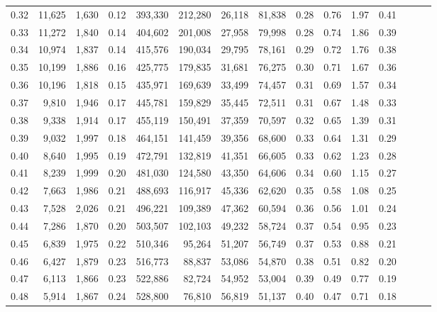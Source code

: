\begin{tabular}{rrrrrrrrrrrrrrr}
0.32 &  11,625 &  1,630 &  0.12 &  393,330 &  212,280 &   26,118 &   81,838 &  0.28 &  0.76 &  1.97 &      0.41 \\
0.33 &  11,272 &  1,840 &  0.14 &  404,602 &  201,008 &   27,958 &   79,998 &  0.28 &  0.74 &  1.86 &      0.39 \\
0.34 &  10,974 &  1,837 &  0.14 &  415,576 &  190,034 &   29,795 &   78,161 &  0.29 &  0.72 &  1.76 &      0.38 \\
0.35 &  10,199 &  1,886 &  0.16 &  425,775 &  179,835 &   31,681 &   76,275 &  0.30 &  0.71 &  1.67 &      0.36 \\
0.36 &  10,196 &  1,818 &  0.15 &  435,971 &  169,639 &   33,499 &   74,457 &  0.31 &  0.69 &  1.57 &      0.34 \\
0.37 &   9,810 &  1,946 &  0.17 &  445,781 &  159,829 &   35,445 &   72,511 &  0.31 &  0.67 &  1.48 &      0.33 \\
0.38 &   9,338 &  1,914 &  0.17 &  455,119 &  150,491 &   37,359 &   70,597 &  0.32 &  0.65 &  1.39 &      0.31 \\
0.39 &   9,032 &  1,997 &  0.18 &  464,151 &  141,459 &   39,356 &   68,600 &  0.33 &  0.64 &  1.31 &      0.29 \\
0.40 &   8,640 &  1,995 &  0.19 &  472,791 &  132,819 &   41,351 &   66,605 &  0.33 &  0.62 &  1.23 &      0.28 \\
0.41 &   8,239 &  1,999 &  0.20 &  481,030 &  124,580 &   43,350 &   64,606 &  0.34 &  0.60 &  1.15 &      0.27 \\
0.42 &   7,663 &  1,986 &  0.21 &  488,693 &  116,917 &   45,336 &   62,620 &  0.35 &  0.58 &  1.08 &      0.25 \\
0.43 &   7,528 &  2,026 &  0.21 &  496,221 &  109,389 &   47,362 &   60,594 &  0.36 &  0.56 &  1.01 &      0.24 \\
0.44 &   7,286 &  1,870 &  0.20 &  503,507 &  102,103 &   49,232 &   58,724 &  0.37 &  0.54 &  0.95 &      0.23 \\
0.45 &   6,839 &  1,975 &  0.22 &  510,346 &   95,264 &   51,207 &   56,749 &  0.37 &  0.53 &  0.88 &      0.21 \\
0.46 &   6,427 &  1,879 &  0.23 &  516,773 &   88,837 &   53,086 &   54,870 &  0.38 &  0.51 &  0.82 &      0.20 \\
0.47 &   6,113 &  1,866 &  0.23 &  522,886 &   82,724 &   54,952 &   53,004 &  0.39 &  0.49 &  0.77 &      0.19 \\
0.48 &   5,914 &  1,867 &  0.24 &  528,800 &   76,810 &   56,819 &   51,137 &  0.40 &  0.47 &  0.71 &      0.18 \\

\end{tabular}
